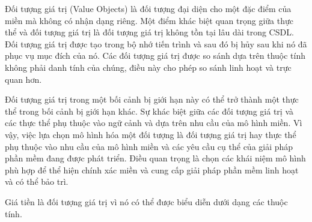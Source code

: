 Đối tượng giá trị (Value Objects) là đối tượng đại diện cho một đặc điểm của miền mà không có nhận dạng riêng. Một điểm khác biệt quan trọng giữa thực thể và đối tượng giá trị là đối tượng giá trị không tồn tại lâu dài trong CSDL. Đối tượng giá trị được tạo trong bộ nhớ tiến trình và sau đó bị hủy sau khi nó đã phục vụ mục đích của nó. Các đối tượng giá trị được so sánh dựa trên thuộc tính không phải danh tính của chúng, điều này cho phép so sánh linh hoạt và trực quan hơn.

Đối tượng giá trị trong một bối cảnh bị giới hạn này có thể trở thành một thực thể trong bối cảnh bị giới hạn khác. Sự khác biệt giữa các đối tượng giá trị và các thực thể phụ thuộc vào ngữ cảnh và dựa trên nhu cầu của mô hình miền. Vì vậy, việc lựa chọn mô hình hóa một đối tượng là đối tượng giá trị hay thực thể phụ thuộc vào nhu cầu của mô hình miền và các yêu cầu cụ thể của giải pháp phần mềm đang được phát triển. Điều quan trọng là chọn các khái niệm mô hình phù hợp để thể hiện chính xác miền và cung cấp giải pháp phần mềm linh hoạt và có thể bảo trì.

\begin{example} Giá tiền là đối tượng giá trị vì nó có thể được biểu diễn dưới dạng các thuộc tính. \end{example}
















